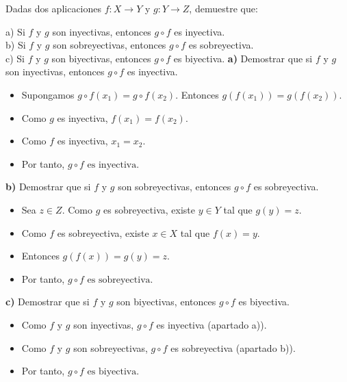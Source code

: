 \documentclass[a4paper,12pt]{article}
\begin{document}
\begin{ejercicio}[title=Ejercicio 20]
Dadas dos aplicaciones $f:X\to Y$ y $g:Y\to Z$, demuestre que:

a) Si $f$ y $g$ son inyectivas, entonces $g\circ f$ es inyectiva.\\
b) Si $f$ y $g$ son sobreyectivas, entonces $g\circ f$ es sobreyectiva.\\
c) Si $f$ y $g$ son biyectivas, entonces $g\circ f$ es biyectiva.
\tcblower
\textbf{a) } Demostrar que si $f$ y $g$ son inyectivas, entonces $g \circ f$ es inyectiva.

\begin{itemize}
  \item Supongamos $g \circ f(x_1) = g \circ f(x_2)$.  
  Entonces $g(f(x_1)) = g(f(x_2))$.
  \item Como $g$ es inyectiva, $f(x_1) = f(x_2)$.  
  \item Como $f$ es inyectiva, $x_1 = x_2$.
  \item Por tanto, $\boxed{g \circ f \text{ es inyectiva}.}$
\end{itemize}

\textbf{b) } Demostrar que si $f$ y $g$ son sobreyectivas, entonces $g \circ f$ es sobreyectiva.

\begin{itemize}
  \item Sea $z \in Z$. Como $g$ es sobreyectiva, existe $y \in Y$ tal que $g(y) = z$.
  \item Como $f$ es sobreyectiva, existe $x \in X$ tal que $f(x) = y$.
  \item Entonces $g(f(x)) = g(y) = z$.
  \item Por tanto, $\boxed{g \circ f \text{ es sobreyectiva}.}$
\end{itemize}

\textbf{c) } Demostrar que si $f$ y $g$ son biyectivas, entonces $g \circ f$ es biyectiva.

\begin{itemize}
  \item Como $f$ y $g$ son inyectivas, $g \circ f$ es inyectiva (apartado a)).
  \item Como $f$ y $g$ son sobreyectivas, $g \circ f$ es sobreyectiva (apartado b)).
  \item Por tanto, $\boxed{g \circ f \text{ es biyectiva}.}$
\end{itemize}

\end{ejercicio}
\end{document}
